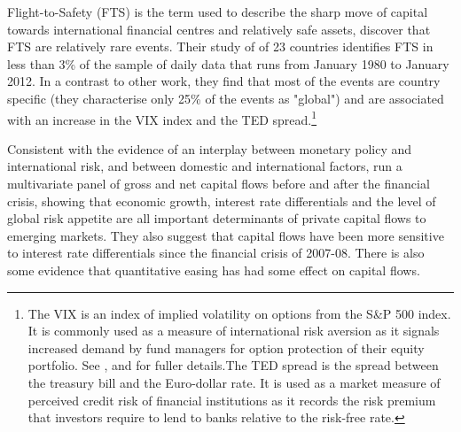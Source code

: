 \documentclass[12pt, a4paper, oneside]{article} %
\begin{document}
Flight-to-Safety (FTS) is the term used to describe the sharp move of capital towards international financial centres and relatively safe assets, \citet{FTS} discover that FTS are relatively rare events. Their study of of 23 countries identifies FTS in less than 3\% of the sample of daily data that runs from January 1980 to January 2012.  In a contrast to other work, they find that most of the events are country specific (they characterise only 25\% of the events as "global") and are associated with an increase in the VIX index and the TED spread.\footnote{The VIX is an index of implied volatility on options from the S\&P 500 index.  It is commonly used as a measure of international risk aversion as it signals increased demand by fund managers for option protection of their equity portfolio.  See \citet{VIX}, \citet{GoldmanVol} and \citet{Diamond} for fuller details.The TED spread is the spread between the treasury bill and the Euro-dollar rate.  It is used as a market measure of perceived credit risk of financial institutions as it records the risk premium that investors require to lend to banks relative to the risk-free rate.}   %


Consistent with the evidence of an interplay between monetary policy and international risk, and between domestic and international factors, \citet{Ahmed2014} run a multivariate panel of gross and net capital flows before and after the financial crisis, showing that economic growth, interest rate differentials and the level of global risk appetite are all important determinants of private capital flows to emerging markets.  They also suggest that capital flows have been more sensitive to interest rate differentials since the financial crisis of 2007-08. There is also some evidence that quantitative easing has had some effect on capital flows. 
\end{document}
